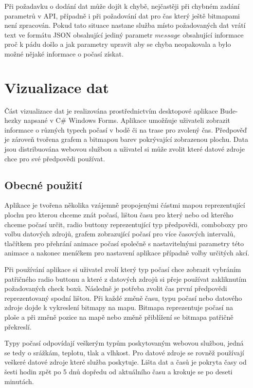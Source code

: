 \documentclass[czech,bachelor,dept460,male,csharp,cpdeclaration]{diploma}
\begin{document}
	Při požadavku o dodání dat může dojít k chybě, nejčastěji při chybném zadání parametrů v API, případně i při požadování dat pro čas který ještě bitmapami není zpracován. Pokud tato situace nastane služba místo požadovaných dat vrátí text ve formátu JSON obsahující jediný parametr $message$ obsahující informace proč k pádu došlo a jak parametry upravit aby se chyba neopakovala a bylo možné nějaké informace o počasí získat.
	
	\chapter{Vizualizace dat}
	
	Část vizualizace dat je realizována prostřednictvím desktopové aplikace Bude-hezky napsané v C\# Windows Forms. Aplikace umožňuje uživateli zobrazit informace o různých typech počasí v bodě či na trase pro zvolený čas. Předpověď je zároveň tvořena grafem a bitmapou barev pokrývající zobrazenou plochu. Data jsou distribuována webovou službou a uživatel si může zvolit které datové zdroje chce pro své předpovědi používat.
	
	\section{Obecné použití}
	
	Aplikace je tvořena několika vzájemně propojenými částmi mapou reprezentující plochu pro kterou chceme znát počasí, lištou času pro který nebo od kterého chceme počasí určit, radio buttony reprezentující typ předpovědi, comboboxy pro volbu datových zdrojů, grafem zobrazující počasí pro více časových intervalů, tlačítkem pro přehrání animace počasí společně s nastavitelnými parametry této animace a nakonec meníčkem pro nastavení aplikace případně volby určitých akcí.
	
	Při používání aplikace si uživatel zvolí který typ počasí chce zobrazit vybráním patřičného radio buttonu a které z datových zdrojů si přeje používat zakliknutím požadovaných check boxů. Následně je potřeba zvolit čas první předpovědi reprezentovaný spodní lištou. Při každé změně času, typu počasí nebo datového zdroje dojde k vykreslení bitmapy na mapu. Bitmapa reprezentuje počasí na ploše a při změně pozice na mapě nebo změně přiblížení se bitmapa patřičně překreslí.
	
	Typy počasí odpovídají veškerým typům poskytovaným webovou službou, jedná se tedy o srážkám, teplotu, tlak a vlhkost. Pro datové zdroje se rovněž používají veškeré datové zdroje které služba poskytuje. Lišta dat a časů 
	je pokryta časy od šesti hodin zpět po 5 dnů dopředu od aktuálního času a krokuje se po deseti minutách.
	
\end{document}
